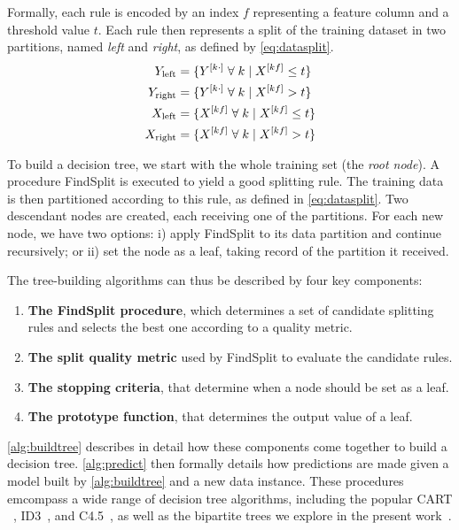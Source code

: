 Formally, each rule is encoded by an index $f$ representing a feature column and a threshold value $t$. Each rule then represents a split of the training dataset in two partitions, named \emph{left} and \emph{right}, as defined by \autoref{eq:datasplit}.
%
\begin{equation}
    \begin{split} %
        Y_\text{left} &=\{Y\el{k\cdot} \;\forall\; k \mid X\el{kf} \le t\}\\
        Y_\text{right} &=\{Y\el{k\cdot} \;\forall\; k \mid X\el{kf} > t\}\\
        X_\text{left} &=\{X\el{kf} \;\forall\; k \mid X\el{kf} \le t\}\\
        X_\text{right} &=\{X\el{kf} \;\forall\; k \mid X\el{kf} > t\}\\
    \end{split}
    \label{eq:datasplit}
\end{equation}

To build a decision tree, we start with the whole training set (the \emph{root node}). A procedure FindSplit is executed to yield a good splitting rule.
The training data is then partitioned according to this rule, as defined in \autoref{eq:datasplit}. Two descendant nodes are created, each receiving one of the partitions.
For each new node, we have two options: i) apply FindSplit to its data partition and continue recursively; or ii) set the node as a leaf, taking record of the partition it received.

The tree-building algorithms can thus be described by four key components:
%
\begin{enumerate}
    \item \textbf{The FindSplit procedure}, which determines a set of candidate splitting rules and selects the best one according to a quality metric.
    \item \textbf{The split quality metric} used by FindSplit to evaluate the candidate rules.
    \item \textbf{The stopping criteria}, that determine when a node should be set as a leaf.
    \item \textbf{The prototype function}, that determines the output value of a leaf.
\end{enumerate}
%
\autoref{alg:buildtree} describes in detail how these components come together to build a decision tree. \autoref{alg:predict} then formally details how predictions are made given a model built by \autoref{alg:buildtree} and a new data instance.
%
These procedures emcompass a wide range of decision tree algorithms, including the popular CART ~\cite{breiman1984classification}, ID3~\cite{quinlan1986induction}, and C4.5~\cite{quinlan}, as well as the bipartite trees we explore in the present work~\cite{pliakos2018global}.  %

